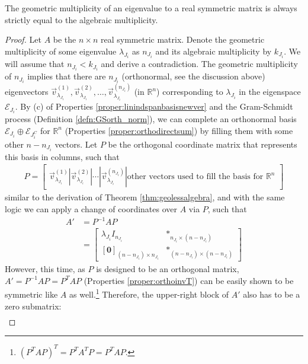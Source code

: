 \begin{proper}
\label{proper:symnodefic}
The geometric multiplicity of an eigenvalue to a real symmetric matrix is always strictly equal to the algebraic multiplicity.
\end{proper}
\begin{proof}
Let $A$ be the $n \times n$ real symmetric matrix. Denote the geometric multiplicity of some eigenvalue $\lambda_{J_i}$ as $n_{J_i}$ and its algebraic multiplicity by $k_{J_i}$. We will assume that $n_{J_i} < k_{J_i}$ and derive a contradiction. The geometric multiplicity of $n_{J_i}$ implies that there are $n_{J_i}$ (orthonormal, see the discussion above) eigenvectors $\vec{v}^{(1)}_{\lambda_{J_i}}, \vec{v}^{(2)}_{\lambda_{J_i}}, \ldots, \vec{v}^{(n_{J_i})}_{\lambda_{J_i}}$ (in $\mathbb{R}^n$) corresponding to $\lambda_{J_i}$ in the eigenspace $\mathcal{E}_{J_i}$. By (c) of Properties \ref{proper:linindspanbasisnewver} and the Gram-Schmidt process (Definition \ref{defn:GSorth_norm}), we can complete an orthonormal basis $\mathcal{E}_{J_i} \oplus \mathcal{E}_{J_i^C}$ for $\mathbb{R}^n$ (Properties \ref{proper:orthodirectsum}) by filling them with some other $n-n_{J_i}$ vectors. Let $P$ be the orthogonal coordinate matrix that represents this basis in columns, such that
\begin{align*}
P = \begin{bmatrix}
\vec{v}^{(1)}_{\lambda_{J_i}} | \vec{v}^{(2)}_{\lambda_{J_i}} | \cdots | \vec{v}^{(n_{J_i})}_{\lambda_{J_i}} | \text{other vectors used to fill the basis for $\mathbb{R}^n$}
\end{bmatrix}
\end{align*}
similar to the derivation of Theorem \ref{thm:geolessalgebra}, and with the same logic we can apply a change of coordinates over $A$ via $P$, such that
\begin{align*}
A' &= P^{-1}AP \\
&= \begin{bmatrix}
\lambda_{J_i} I_{n_{J_i}} & *_{n_{J_i}\times(n-n_{J_i})} \\
[\textbf{0}]_{(n-n_{J_i})\times n_{J_i}} & *_{(n-n_{J_i})\times(n-n_{J_i})}
\end{bmatrix}
\end{align*}
However, this time, as $P$ is designed to be an orthogonal matrix, $A' = P^{-1}AP = P^TAP$ (Properties \ref{proper:orthoinvT}) can be easily shown to be symmetric like $A$ as well.\footnote{$(P^TAP)^T = P^TA^TP = P^TAP$.} Therefore, the upper-right block of $A'$ also has to be a zero submatrix:
\begin{align*}

\end{align*}
\end{proof}
